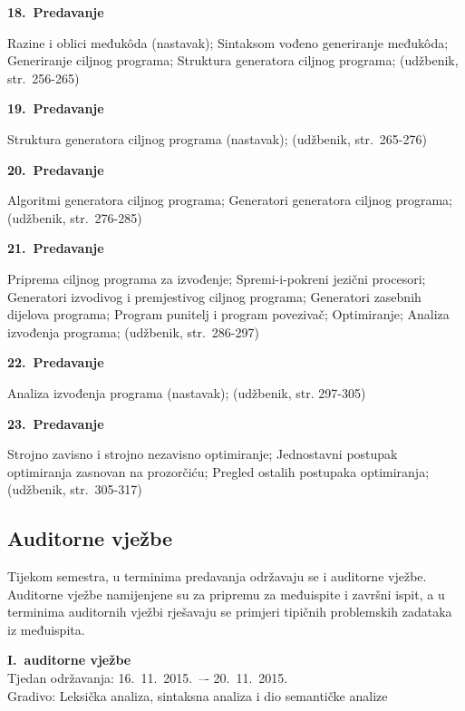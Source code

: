 \documentclass[times, 12pt, utf8]{book}
\newenvironment{myindentpar}[1]%
{\begin{list}{}%
         {\setlength{\leftmargin}{#1}}%
         \item[]%
}
{\end{list}}
\begin{document}
\textbf{18.~Predavanje}
\begin{myindentpar}{30pt}
Razine i oblici međukôda (nastavak); Sintaksom vođeno generiranje međukôda; Generiranje ciljnog programa; Struktura generatora ciljnog programa; (udžbenik, str.~256-265)
\end{myindentpar}

\textbf{19.~Predavanje}
\begin{myindentpar}{30pt}
Struktura generatora ciljnog programa (nastavak); (udžbenik, str.~265-276) 
\end{myindentpar}

\textbf{20.~Predavanje}
\begin{myindentpar}{30pt}
Algoritmi generatora ciljnog programa; Generatori generatora ciljnog programa; (udžbenik, str.~276-285) 
\end{myindentpar}

\textbf{21.~Predavanje}
\begin{myindentpar}{30pt}
Priprema ciljnog programa za izvođenje; Spremi-i-pokreni jezični procesori; Generatori izvodivog i premjestivog ciljnog programa; Generatori zasebnih dijelova programa; Program punitelj i program povezivač; Optimiranje; Analiza izvođenja programa; (udžbenik, str.~286-297)
\end{myindentpar}

\textbf{22.~Predavanje}
\begin{myindentpar}{30pt}
Analiza izvođenja programa (nastavak); (udžbenik, str. 297-305)
\end{myindentpar}

\textbf{23.~Predavanje}
\begin{myindentpar}{30pt}
Strojno zavisno i strojno nezavisno optimiranje; Jednostavni postupak optimiranja zasnovan na prozorčiću; Pregled ostalih postupaka optimiranja; (udžbenik, str.~305-317)
\end{myindentpar}

\cleardoublepage  
{}  
{}
\subsection*{Auditorne vježbe}

Tijekom semestra, u terminima predavanja održavaju se i auditorne vježbe.
Auditorne vježbe namijenjene su za pripremu za međuispite i završni ispit, a u terminima auditornih vježbi rješavaju se primjeri tipičnih problemskih zadataka iz međuispita.

\textbf{I.~auditorne vježbe} \\
Tjedan održavanja: 16.~11.~2015.~–- 20.~11.~2015. \\
Gradivo: Leksička analiza, sintaksna analiza i dio semantičke analize
\end{document}
